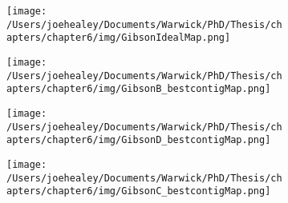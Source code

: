 \begin{figure}[p]
\centering
  \begin{subfigure}{\textwidth}
    \texttt{[image: /Users/joehealey/Documents/Warwick/PhD/Thesis/chapters/chapter6/img/GibsonIdealMap.png]}
    \captionsetup{singlelinecheck=off, justification=centering, font=footnotesize, aboveskip=10pt}
    \caption{}
    \label{gibsonidealmap}
  \end{subfigure}

  \begin{subfigure}{\textwidth}
    \texttt{[image: /Users/joehealey/Documents/Warwick/PhD/Thesis/chapters/chapter6/img/GibsonB\_bestcontigMap.png]}
    \captionsetup{singlelinecheck=off, justification=centering, font=footnotesize, aboveskip=10pt}
    \caption{}
  \end{subfigure}

  \begin{subfigure}{\textwidth}
    \texttt{[image: /Users/joehealey/Documents/Warwick/PhD/Thesis/chapters/chapter6/img/GibsonD\_bestcontigMap.png]}
    \captionsetup{singlelinecheck=off, justification=centering, font=footnotesize, aboveskip=10pt}
    \caption{}
  \end{subfigure}
  
  \begin{subfigure}{\textwidth}
    \texttt{[image: /Users/joehealey/Documents/Warwick/PhD/Thesis/chapters/chapter6/img/GibsonC\_bestcontigMap.png]}
    \captionsetup{singlelinecheck=off, justification=centering, font=footnotesize, aboveskip=10pt}
    \caption{}
  \end{subfigure}
    

\end{figure}
